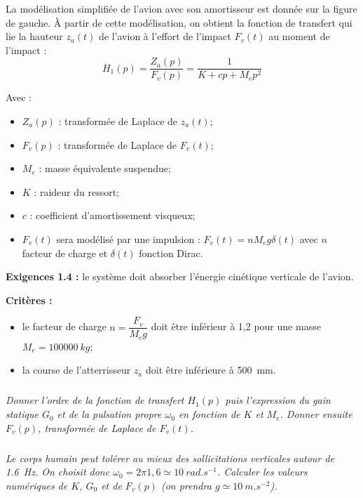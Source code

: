 \documentclass[10pt,fleqn]{article} %
\begin{document}
\begin{multicols}{2}
La modélisation simplifiée de l'avion avec son
amortisseur est donnée sur la figure de gauche. À partir
de cette modélisation, on obtient la fonction de
transfert qui lie la hauteur $z_a(t)$ de l'avion à l’effort de
l’impact $F_v(t)$ au moment de l’impact :
$$
H_1(p)=\dfrac{Z_a(p)}{F_v(p)}=\dfrac{1}{K+cp+M_e p^2}
$$

Avec : 
\begin{itemize}
\item $Z_a(p)$ : transformée de Laplace de $z_a(t)$;
\item $F_v(p)$ : transformée de Laplace de $F_v(t)$;
\item $M_e$ : masse équivalente suspendue;
\item $K$ : raideur du ressort;
\item $c$ : coefficient d’amortissement visqueux;
\item $F_v(t)$ sera modélisé par une impulsion : $F_v(t)=n M_e g \delta (t)$ avec $n$ facteur de charge et 
$\delta (t)$ fonction Dirac.
\end{itemize}


\textbf{Exigences 1.4  : } le système doit absorber l'énergie cinétique verticale de l'avion. 

\textbf{Critères : }
 \begin{itemize}
 \item le facteur de charge $n=\dfrac{F_v}{M_e g}$ doit être inférieur à 1,2 pour une masse $M_e = \SI{100000}{kg}$;
 \item la course de l'atterrisseur $z_a$ doit être inférieure à \SI{500}{mm}.
 \end{itemize}


\subparagraph{}
\textit{%
Donner l’ordre de la fonction
de transfert $H_1(p)$ puis l’expression du gain statique $G_0$ et de la pulsation propre $\omega_0$ en fonction de $K$ et $M_e$.
Donner ensuite $F_v(p)$, transformée de Laplace de $F_v(t)$.}
\ifprof
\begin{corrige}

\end{corrige}
\else
\fi



\subparagraph{}
\textit{Le corps humain peut tolérer au mieux des sollicitations verticales autour de \SI{1,6}{Hz}. On choisit donc $\omega_0 = 2\pi 1,6 \simeq \SI{10}{rad.s^{-1}}$. Calculer les valeurs numériques de $K$, $G_0$ et de $F_v(p)$ (on prendra $g \simeq \SI{10}{m.s^{-2}}$).}
\ifprof
\begin{corrige}
\end{corrige}
\else
\fi



\end{multicols}
\end{document}
